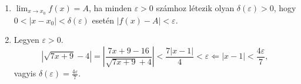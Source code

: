 \documentclass[11pt]{scrartcl}
\begin{document}
\begin{enumerate}
	\item $\lim_{x \to x_0} f(x) = A$, ha minden $\varepsilon > 0$ számhoz
	      létezik olyan $\delta(\varepsilon) > 0$, hogy
	      $0 < |x - x_0| < \delta(\varepsilon)$ esetén
	      $|f(x) - A| < \varepsilon$.

	\item Legyen $\varepsilon > 0$.
	      \[
		      \left| \sqrt{7x + 9} - 4 \right|
		      =
		      \left| \frac{7x + 9 - 16}{\sqrt{7x + 9} + 4} \right|
		      <
		      \frac{7|x - 1|}{4}
		      < \varepsilon
		      \Longleftarrow
		      |x - 1| < \frac{4\varepsilon}{7},
	      \]
	      vagyis
	      \(\displaystyle
	      \delta(\varepsilon) = \frac{4\varepsilon}{7}
	      \).
\end{enumerate}
\end{document}
